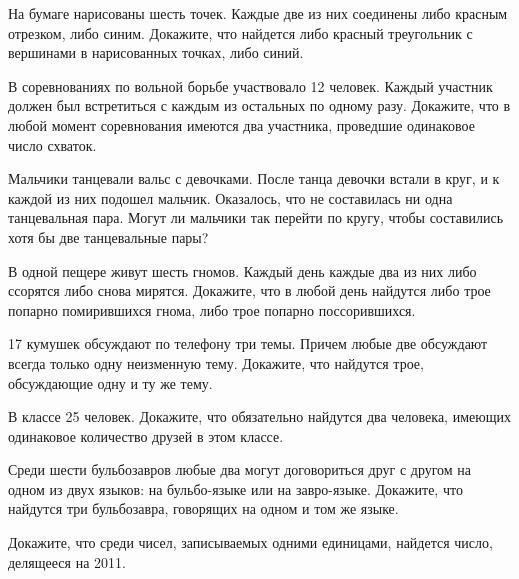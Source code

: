 \begin{thm}
	На бумаге нарисованы шесть точек. Каждые две из них соединены либо красным отрезком, либо синим. Докажите, что найдется либо красный треугольник с вершинами в нарисованных точках, либо синий.
\end{thm}

\begin{thm}
	В соревнованиях по вольной борьбе участвовало 12 человек. Каждый участник должен был встретиться с каждым из остальных по одному разу. Докажите, что в любой момент соревнования имеются два участника, проведшие одинаковое число схваток.
\end{thm}

\begin{thm}
	Мальчики танцевали вальс с девочками. После танца девочки встали в круг, и к каждой из них подошел мальчик. Оказалось, что не составилась ни одна танцевальная пара. Могут ли мальчики так перейти по кругу, чтобы составились хотя бы две танцевальные пары?
\end{thm}

\begin{thm}
	В одной пещере живут шесть гномов. Каждый день каждые два из них либо ссорятся либо снова мирятся. Докажите, что в любой день найдутся либо трое попарно помирившихся гнома, либо трое попарно поссорившихся.
\end{thm}

\begin{thm}
	17 кумушек обсуждают по телефону три темы. Причем любые две обсуждают всегда только одну неизменную тему. Докажите, что найдутся трое, обсуждающие одну и ту же тему.
\end{thm}

\begin{thm}
	В классе 25 человек. Докажите, что обязательно найдутся два человека, имеющих одинаковое количество друзей в этом классе.
\end{thm}

\begin{thm}
	Среди шести бульбозавров любые два могут договориться друг с другом на одном из двух языков: на бульбо-языке или на завро-языке. Докажите, что найдутся три бульбозавра, говорящих на одном и том же языке.
\end{thm}
\begin{thm}
	Докажите, что среди чисел, записываемых одними единицами, найдется число, делящееся на 2011.
\end{thm}

